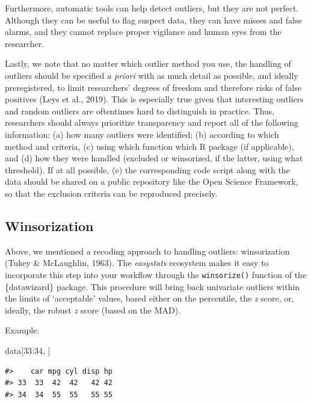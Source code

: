 \documentclass[
]{article}
\newenvironment{Shaded}{\begin{snugshade}}{\end{snugshade}}
\newcommand{\DecValTok}[1]{\textcolor[rgb]{0.00,0.00,0.81}{#1}}
\newcommand{\NormalTok}[1]{#1}
\newcommand{\SpecialCharTok}[1]{\textcolor[rgb]{0.00,0.00,0.00}{#1}}
\begin{document}
Furthermore, automatic tools can help detect outliers, but they are not perfect. Although they can be useful to flag suspect data, they can have misses and false alarms, and they cannot replace proper vigilance and human eyes from the researcher.

Lastly, we note that no matter which outlier method you use, the handling of outliers should be specified \emph{a priori} with as much detail as possible, and ideally preregistered, to limit researchers' degrees of freedom and therefore risks of false positives (Leys et al., 2019). This is especially true given that interesting outliers and random outliers are oftentimes hard to distinguish in practice. Thus, researchers should always prioritize transparency and report all of the following information: (a) how many outliers were identified; (b) according to which method and criteria, (c) using which function which R package (if applicable), and (d) how they were handled (excluded or winsorized, if the latter, using what threshold). If at all possible, (e) the corresponding code script along with the data should be shared on a public repository like the Open Science Framework, so that the exclusion criteria can be reproduced precisely.

\hypertarget{winsorization}{%
\subsection{Winsorization}\label{winsorization}}

Above, we mentioned a recoding approach to handling outliers: winsorization (Tukey \& McLaughlin, 1963). The \emph{easystats} ecosystem makes it easy to incorporate this step into your workflow through the \texttt{winsorize()} function of the \{datawizard\} package. This procedure will bring back univariate outliers within the limits of `acceptable' values, based either on the percentile, the \emph{z} score, or, ideally, the robust \emph{z} score (based on the MAD).

Example:

\begin{Shaded}
\begin{Highlighting}[]
\NormalTok{data[}\DecValTok{33}\SpecialCharTok{:}\DecValTok{34}\NormalTok{, ]}
\end{Highlighting}
\end{Shaded}

\begin{verbatim}
#>    car mpg cyl disp hp
#> 33  33  42  42   42 42
#> 34  34  55  55   55 55
\end{verbatim}
\end{document}
